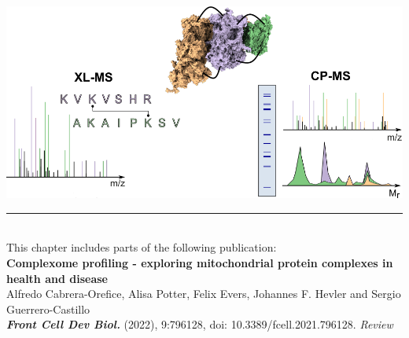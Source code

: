  \label{ch-1}
%
{
    \begin{center}
        \vspace*{3.5cm}
        \includegraphics[]{Chapter.1/Figures/chapter1_cover.png}
        \vspace{0.25cm}
    \end{center}
}
%
\begin{flushleft}
    \vspace*{\fill}
    \rule{\textwidth}{1pt}\\[0cm]
    This chapter includes parts of the following publication:\\
    \textbf{Complexome profiling - exploring mitochondrial protein complexes in health and disease}\\
    \footnotesize
    \vspace{0.3cm}
    Alfredo Cabrera-Orefice, Alisa Potter, Felix Evers, Johannes F. Hevler and Sergio Guerrero-Castillo \\
    \textbf{\emph{Front Cell Dev Biol.}} (2022), 9:796128, doi: 10.3389/fcell.2021.796128. \emph{Review}\\
\end{flushleft}
\newpage
%
